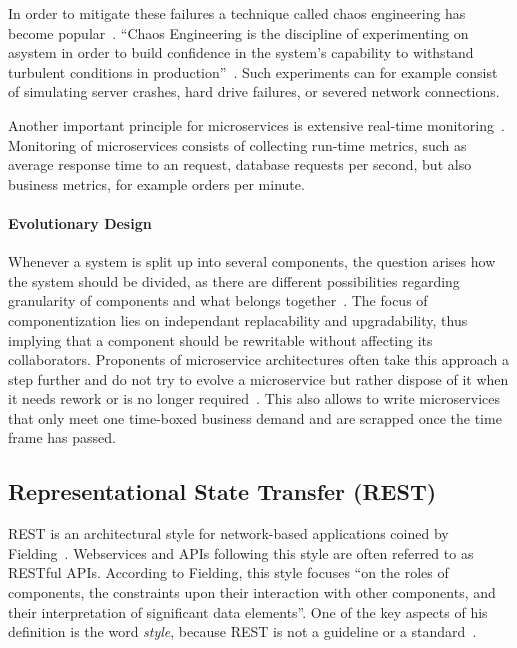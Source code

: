 In order to mitigate these failures a technique called chaos engineering has become popular~\cite{CEC2018}.
``Chaos Engineering is the discipline of experimenting on asystem in order to build confidence in the system's capability to withstand turbulent conditions in production''~\cite{CEC2018}.
Such experiments can for example consist of simulating server crashes, hard drive failures, or severed network connections.

Another important principle for microservices is extensive real-time monitoring~\cite{Lewis2014}.
Monitoring of microservices consists of collecting run-time metrics, such as average response time to an request, database requests per second, but also business metrics, for example orders per minute.

\paragraph{Evolutionary Design}

Whenever a system is split up into several components, the question arises how the system should be divided, as there are different possibilities regarding granularity of components and what belongs together~\cite{Lewis2014}.
The focus of componentization lies on independant replacability and upgradability, thus implying that a component should be rewritable without affecting its collaborators.
Proponents of microservice architectures often take this approach a step further and do not try to evolve a microservice but rather dispose of it when it needs rework or is no longer required~\cite{Fowler2016,Lewis2014}.
This also allows to write microservices that only meet one time-boxed business demand and are scrapped once the time frame has passed.

\subsection{Representational State Transfer (\acs{REST})}

\ac{REST} is an architectural style for network-based applications coined by Fielding~\cite{Fielding2000}.
Webservices and \acp{API} following this style are often referred to as \acs{REST}ful \acp{API}.
According to Fielding, this style focuses ``on the roles of components, the constraints upon their interaction with other components, and their interpretation of significant data elements''.
One of the key aspects of his definition is the word \textit{style}, because \ac{REST} is not a guideline or a standard~\cite{Malakhov2018}.

